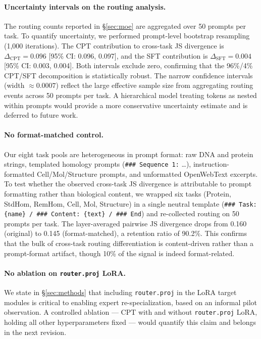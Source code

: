 \documentclass[11pt]{article}
\begin{document}
\paragraph{Uncertainty intervals on the routing analysis.} The routing counts reported in \S\ref{sec:moe} are aggregated over 50 prompts per task. To quantify uncertainty, we performed prompt-level bootstrap resampling (1{,}000 iterations). The CPT contribution to cross-task JS divergence is $\Delta_{\text{CPT}} = 0.096$ [95\% CI: 0.096, 0.097], and the SFT contribution is $\Delta_{\text{SFT}} = 0.004$ [95\% CI: 0.003, 0.004]. Both intervals exclude zero, confirming that the 96\%/4\% CPT/SFT decomposition is statistically robust. The narrow confidence intervals (width $\approx 0.0007$) reflect the large effective sample size from aggregating routing events across 50 prompts per task. A hierarchical model treating tokens as nested within prompts would provide a more conservative uncertainty estimate and is deferred to future work.

\paragraph{No format-matched control.} Our eight task pools are heterogeneous in prompt format: raw DNA and protein strings, templated homology prompts (\texttt{\#\#\# Sequence 1:} \ldots), instruction-formatted Cell/Mol/Structure prompts, and unformatted OpenWebText excerpts. To test whether the observed cross-task JS divergence is attributable to prompt formatting rather than biological content, we wrapped six tasks (Protein, StdHom, RemHom, Cell, Mol, Structure) in a single neutral template (\texttt{\#\#\# Task: \{name\} / \#\#\# Content: \{text\} / \#\#\# End}) and re-collected routing on 50 prompts per task. The layer-averaged pairwise JS divergence drops from 0.160 (original) to 0.145 (format-matched), a retention ratio of 90.2\%. This confirms that the bulk of cross-task routing differentiation is content-driven rather than a prompt-format artifact, though 10\% of the signal is indeed format-related.

\paragraph{No ablation on \texttt{router.proj} LoRA.} We state in \S\ref{sec:methods} that including \texttt{router.proj} in the LoRA target modules is critical to enabling expert re-specialization, based on an informal pilot observation. A controlled ablation --- CPT with and without \texttt{router.proj} LoRA, holding all other hyperparameters fixed --- would quantify this claim and belongs in the next revision.
\end{document}
